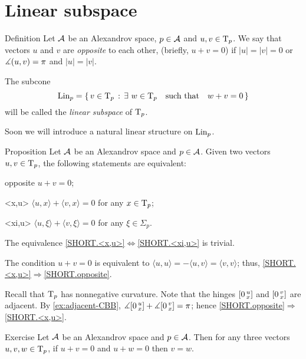 \section{Linear subspace}

\begin{thm}{Definition}\label{def:opp+Lin}
Let $\mathcal{A}$ be an Alexandrov space, $p\in \mathcal{A}$ and $u,v\in\mathrm{T}_p$.
We say that vectors $u$ and $v$ are \emph{opposite}\label{def:opposite:page} to each other, (briefly, $u+v=0$) if $|u|=|v|=0$ or $\measuredangle(u,v)=\pi$ and $|u|=|v|$.

The subcone
\[\mathop{\rm Lin}\nolimits_p=\left\{\,{v\in\mathrm{T}_p}\,:\,{\exists\ w\in\mathrm{T}_p\quad \text{such that}\quad w+v=0}\,\right\}\]
will be called the \emph{linear subspace} of $\mathrm{T}_p$.
\end{thm}

Soon we will introduce a natural linear structure on $\mathop{\rm Lin}\nolimits_p$.

\begin{thm}{Proposition}\label{prop:opposite}
Let $\mathcal{A}$ be an Alexandrov space and $p\in \mathcal{A}$.
Given two vectors $u,v\in\mathrm{T}_p$, the following statements are equivalent:
\begin{subthm}{opposite} $u+v=0$;
\end{subthm}
\begin{subthm}{<x,u>} $\langle u,x\rangle +\langle v,x\rangle =0$ for any $x\in\mathrm{T}_p$;
\end{subthm}
\begin{subthm}{<xi,u>} $\langle u,\xi\rangle +\langle v,\xi\rangle =0$ for any $\xi\in\Sigma_p$.
\end{subthm}
\end{thm}

The equivalence  \ref{SHORT.<x,u>}$\Leftrightarrow$\ref{SHORT.<xi,u>} is trivial.

The condition $u+v=0$ is equivalent to 
$\langle u,u\rangle =-\langle u,v\rangle =\langle v,v\rangle$;
thus,
\ref{SHORT.<x,u>}$\Rightarrow$\ref{SHORT.opposite}.

Recall that $\mathrm{T}_p$ has nonnegative curvature.
Note that the hinges $[0\,{}^{u}_{x}]$ and $[0\,{}^{v}_{x}]$ are adjacent.
By \ref{ex:adjacent-CBB}, $\measuredangle[0\,{}^{u}_{x}]+\measuredangle[0\,{}^{v}_{x}]=\pi$;
hence \ref{SHORT.opposite}$\Rightarrow$\ref{SHORT.<x,u>}.
\qeds

\begin{thm}{Exercise}\label{prop:two-opp}
Let $\mathcal{A}$  be an Alexandrov space and $p\in \mathcal{A}$.
Then for any three vectors $u,v,w\in\mathrm{T}_p$, if $u+v=0$ and $u+ w=0$ then $v=w$.
\end{thm}

